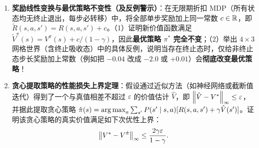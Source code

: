 \begin{enumerate}[label=\textbf{6.\arabic*}, resume]
  \item \textbf{奖励线性变换与最优策略不变性（及反例警示）}：在无限期折扣 MDP（所有状态均无终止退出，每步必转移）中，将全部单步奖励加上同一常数 $c \in \mathbb{R}$，即 $\tilde{R}(s, a, s') = R(s, a, s') + c$。（1）证明新价值函数满足 $\tilde{V}^\pi(s) = V^\pi(s) + c/(1-\gamma)$，因此\textbf{最优策略 $\pi^*$ 完全不变}；（2）举出 $4\times 3$ 网格世界（含终止吸收态）中的具体反例，说明当存在终止态时，仅给非终止态步长奖励加上常数（例如把 $-0.04$ 改成 $-2.0$ 或 $+0.01$）会\textbf{彻底改变最优策略}！

  \item \textbf{贪心提取策略的性能损失上界定理}：假设通过近似方法（如神经网络或截断值迭代）得到了一个与真值相差不超过 $\varepsilon$ 的价值估计 $\hat{V}$，即 $\left\|\hat{V} - V^*\right\|_\infty \le \varepsilon$，并据此提取贪心策略 $\hat{\pi}(s) = \operatorname*{arg\,max}_a \sum_{s'} P(s'\mid s,a)[R(s,a,s') + \gamma \hat{V}(s')]$。证明该贪心策略的真实价值满足如下次优性上界：
  \[
    \left\|V^* - V^{\hat{\pi}}\right\|_\infty \le \frac{2\gamma \varepsilon}{1 - \gamma}.
  \]
\end{enumerate}


